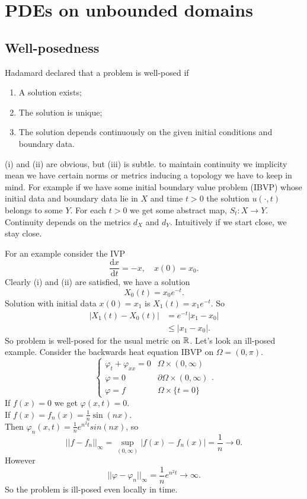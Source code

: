 \documentclass{article}
\begin{document}
\section{PDEs on unbounded domains}
\subsection{Well-posedness}
Hadamard declared that a problem is well-posed if
\begin{enumerate}
	\item A solution exists;
	\item The solution is unique;
	\item The solution depends continuously on the given initial conditions and boundary data.
\end{enumerate}
(i) and (ii) are obvious, but (iii) is subtle. to maintain continuity we implicity mean we have certain norms or metrics inducing a topology we have to keep in mind. For example if we have some initial boundary value problem (IBVP) whose initial data and boundary data lie in $ X $ and time $ t>0 $ the solution $ u(\cdot, t) $ belongs to some $ Y $. For each $ t>0 $ we get some abstract map, $ S_t:X\to Y $. Continuity depends on the metrics $ d_X $ and $ d_Y $. Intuitively if we start close, we stay close.\par
For an example consider the IVP
\[
	\frac{\mathrm dx}{\mathrm dt}=-x,\quad x(0)=x_0.
\]
Clearly (i) and (ii) are satisfied, we have a solution
\[
  X_0(t)=x_0e^{-t}.
\]
Solution with initial data $ x(0)=x_1 $ is $ X_1(t)=x_1e^{-t} $. So
\begin{align*}
	|X_1(t)-X_0(t)|&=e^{-t}|x_1-x_0|\\
		       &\le |x_1-x_0|.
\end{align*}
So problem is well-posed for the usual metric on $ \mathbb{R} $. Let's look an ill-posed example. Consider the backwards heat equation IBVP on $ \Omega=(0,\pi) $.
\[
  \begin{cases}
	  \varphi_t+\varphi_{xx}=0 & \Omega\times (0,\infty) \\
	  \varphi = 0 & \partial\Omega\times (0,\infty)\\
	  \varphi = f & \Omega\times \{t=0\}
  \end{cases}.
\]
If $ f(x)=0 $ we get $ \varphi(x,t)=0 $.\\
If $ f(x)=f_n(x)=\frac 1n\sin(nx) $.\\
Then $ \varphi_n(x,t)=\frac 1ne^{n^2t}sin(nx) $, so
\[
	||f-f_n||_\infty=\sup_{(0,\infty)}|f(x)-f_n(x)|=\frac 1n\to 0.
\]
However
\[
	||\varphi-\varphi_n||_\infty=\frac 1ne^{n^2t}\to \infty.
\]
So the problem is ill-posed even locally in time.
\end{document}
